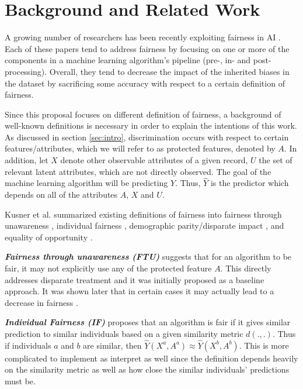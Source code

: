 \documentclass[11pt]{article}
\begin{document}
\section{Background and Related Work}
A growing number of researchers has been recently exploiting fairness in AI \cite{calmon2017optimized, zafar2017fairness, kusner2017counterfactual, pleiss2017fairness, chiappa2018path, dwork2017decoupled, russell2017worlds, zhang2018fairness}. Each of these papers tend to address fairness by focusing on one or more of the components in a machine learning algorithm's pipeline (pre-, in- and post-processing). Overall, they tend to decrease the impact of the inherited biases in the dataset by sacrificing some accuracy with respect to a certain definition of fairness.

Since this proposal focuses on different definition of fairness, a background of well-known definitions is necessary in order to explain the intentions of this work. As discussed in section \ref{sec:intro}, discrimination occurs with respect to certain features/attributes, which we will refer to as protected features, denoted by $A$. In addition, let $X$ denote other observable attributes of a given record, $U$ the set of relevant latent attributes, which are not directly observed. The goal of the machine learning algorithm will be predicting $Y$. Thus, $\hat{Y}$ is the predictor which depends on all of the attributes $A$, $X$ and $U$.

Kusner et al. \cite{kusner2017counterfactual} summarized existing definitions of fairness into fairness through unawareness \cite{grgic2016case}, individual fairness \cite{dwork2012fairness, joseph2016rawlsian, louizos2015variational}, demographic parity/disparate impact \cite{zafar2017fairness}, and equality of opportunity \cite{hardt2016equality, zafar2017fairnessbeyond}.

\textbf{\textit{Fairness through unawareness (FTU)}} suggests that for an algorithm to be fair, it may not explicitly use any of the protected feature $A$. This directly addresses disparate treatment and it was initially proposed as a baseline approach. It was shown later that in certain cases it may actually lead to a decrease in fairness \cite{kusner2017counterfactual}.

\textbf{\textit{Individual Fairness (IF)}} proposes that an algorithm is fair if it gives similar prediction to similar individuals based on a given similarity metric $d(., .)$. Thus if individuals $a$ and $b$ are similar, then $\hat{Y}(X^a, A^a) \approx \hat{Y}(X^b, A^b)$. This is more complicated to implement as interpret as well since the definition depends heavily on the similarity metric as well as how close the similar individuals' predictions must be.
\end{document}
